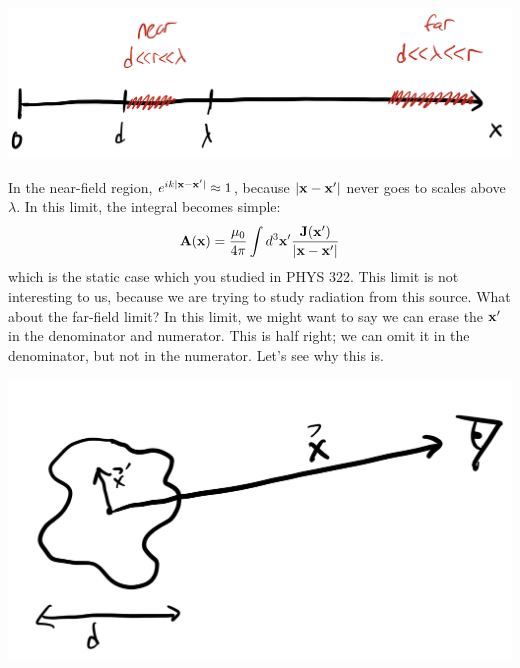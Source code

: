 \begin{center}
    \includegraphics[scale=0.35]{Lectures/Images/lec10-nearfar.png}
\end{center}

In the near-field region, $e^{ik\lvert \mathbf{x} - \mathbf{x}' \rvert} \approx 1$, because $\lvert \mathbf{x} - \mathbf{x}' \rvert$ never goes to scales above $\lambda$. In this limit, the integral becomes simple:
\begin{equation}
    \mathbf{A}(\mathbf{x}) = \frac{\mu_0}{4\pi}\int d^3\mathbf{x}'\frac{\mathbf{J}(\mathbf{x'})}{\lvert \mathbf{x} - \mathbf{x}' \rvert}
\end{equation}
which is the static case which you studied in PHYS 322. This limit is not interesting to us, because we are trying to study radiation from this source. What about the far-field limit? In this limit, we might want to say we can erase the $\mathbf{x}'$ in the denominator and numerator. This is half right; we can omit it in the denominator, but not in the numerator. Let's see why this is.

\begin{center}
    \includegraphics[scale=0.35]{Lectures/Images/lec10-rrprime.png}
\end{center}

